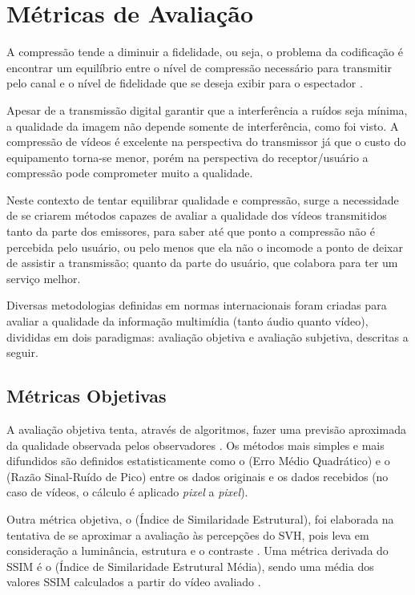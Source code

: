 \section{Métricas de Avaliação}

A compressão tende a diminuir a fidelidade, ou seja, o problema da codificação é encontrar um equilíbrio entre o nível de compressão necessário para transmitir pelo canal e o nível de fidelidade que se deseja exibir para o espectador \cite{daronco}.

Apesar de a transmissão digital garantir que a interferência a ruídos seja mínima, a qualidade da imagem não depende somente de interferência, como foi visto. A compressão de vídeos é excelente na perspectiva do transmissor já que o custo do equipamento torna-se menor, porém na perspectiva do receptor/usuário a compressão pode comprometer muito a qualidade.

Neste contexto de tentar equilibrar qualidade e compressão, surge a necessidade de se criarem métodos capazes de avaliar a qualidade dos vídeos transmitidos tanto da parte dos emissores, para saber até que ponto a compressão não é percebida pelo usuário, ou pelo menos que ela não o incomode a ponto de deixar de assistir a transmissão; quanto da parte do usuário, que colabora para ter um serviço melhor.

Diversas metodologias definidas em normas internacionais foram criadas para avaliar a qualidade da informação multimídia (tanto áudio quanto vídeo), divididas em dois paradigmas: avaliação objetiva e avaliação subjetiva, descritas a seguir.

\subsection{Métricas Objetivas}

A avaliação objetiva tenta, através de algoritmos, fazer uma previsão aproximada da qualidade observada pelos observadores \cite{albini}. Os métodos mais simples e mais difundidos são definidos estatisticamente como o  (Erro Médio Quadrático) e o  (Razão Sinal-Ruído de Pico) \cite{emmersonsilva} entre os dados originais e os dados recebidos (no caso de vídeos, o cálculo é aplicado \emph{pixel} a \emph{pixel}).

Outra métrica objetiva, o  (Índice de Similaridade Estrutural), foi elaborada na tentativa de se aproximar a avaliação às percepções do SVH, pois leva em consideração a luminância, estrutura e o contraste \cite{emmersonsilva}. Uma métrica derivada do SSIM é o  (Índice de Similaridade Estrutural Média), sendo uma média dos valores SSIM calculados a partir do vídeo avaliado \cite{wangbovik2004}.

